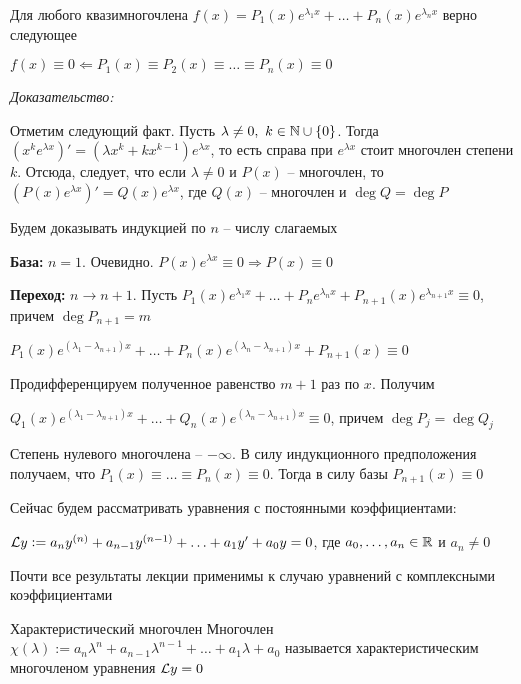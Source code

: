 \documentclass[12pt]{article}
\begin{document}
\begin{lem}{}
    Для любого квазимногочлена $f(x) = P_1(x)e^{\lambda_1x} + \ldots + P_n(x)e^{\lambda_nx}$ верно следующее

    $f(x) \equiv 0 \Leftarrow P_1(x) \equiv P_2(x) \equiv \ldots \equiv P_n(x) \equiv 0$
\end{lem}

\textit{Доказательство:}

Отметим следующий факт. Пусть $\lambda \neq 0,\ k \in \mathbb N \cup \{0\}$. Тогда $(x^ke^{\lambda x})' = (\lambda x^k + kx^{k - 1})e^{\lambda x}$, то есть справа при $e^{\lambda x}$ стоит многочлен степени $k$. Отсюда, следует, что если $\lambda \neq 0$ и $P(x)$ -- многочлен, то $(P(x)e^{\lambda x})' = Q(x)e^{\lambda x}$, где $Q(x)$ -- многочлен и $\deg Q = \deg P$

Будем доказывать индукцией по $n$ -- числу слагаемых 

\textbf{База:} $n = 1$. Очевидно. $P(x)e^{\lambda x} \equiv 0 \Rightarrow P(x) \equiv 0$

\textbf{Переход:} $n \to n + 1$. Пусть $P_1(x)e^{\lambda_1x} + \ldots + P_ne^{\lambda_nx} + P_{n + 1}(x)e^{\lambda_{n + 1}x} \equiv 0$, причем $\deg P_{n + 1} = m$

$P_1(x)e^{(\lambda_1 - \lambda_{n + 1})x} + \ldots + P_n(x)e^{(\lambda_n - \lambda_{n + 1})x} + P_{n + 1}(x) \equiv 0$

Продифференцируем полученное равенство $m + 1$ раз по $x$. Получим 

$Q_1(x)e^{(\lambda_1 - \lambda_{n + 1})x} + \ldots + Q_n(x)e^{(\lambda_n - \lambda_{n + 1})x} \equiv 0$, причем $\deg P_j = \deg Q_j$

Степень нулевого многочлена -- $- \infty$. В силу индукционного предположения получаем, что $P_1(x) \equiv \ldots \equiv P_n(x) \equiv 0$. Тогда в силу базы $P_{n + 1}(x) \equiv 0$

\begin{nota}{}
    Сейчас будем рассматривать уравнения с постоянными коэффициентами: 

    $\mathcal{L} y := a_ny^{(n)} + a_{n - 1}y^{(n - 1)} + \ldots + a_1y' + a_0y = 0$, где $a_0, \ldots, a_n \in \mathbb R$ и $a_n \neq 0$
\end{nota}

\begin{Remark}{}
    Почти все результаты лекции применимы к случаю уравнений с комплексными коэффициентами 
\end{Remark}

\begin{defin}{Характеристический многочлен}
    Многочлен $\chi(\lambda) := a_n\lambda^n + a_{n - 1}\lambda^{n - 1} + \ldots + a_1\lambda + a_0$ называется характеристическим многочленом уравнения $\mathcal{L} y = 0$
\end{defin}
\end{document}
